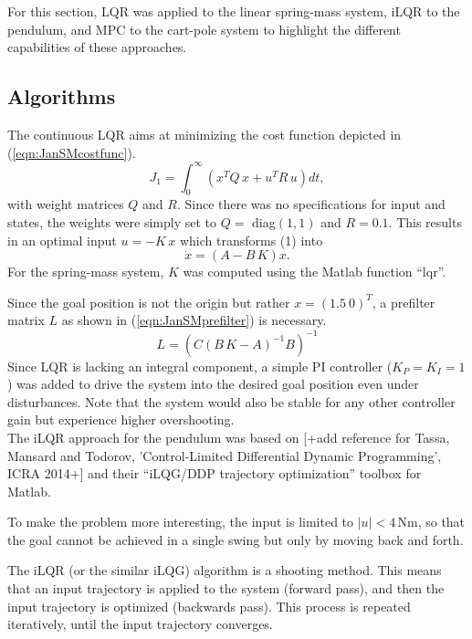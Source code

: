 \documentclass[letterpaper, 10 pt, conference]{ieeeconf}  %
\begin{document}
For this section, LQR was applied to the linear spring-mass system, iLQR to the pendulum, and MPC to the cart-pole system to highlight the different capabilities of these approaches.
\subsection{Algorithms}


The continuous LQR aims at minimizing the cost function depicted in (\ref{eqn:JanSMcostfunc}).
\begin{equation}\label{eqn:JanSMcostfunc}
	J_1 = \int^{\infty}_{0} \left(x^{T}Q\,x + u^{T}R\,u\right)dt,
\end{equation}
with weight matrices $Q$ and $R$.
Since there was no specifications for input and states, the weights were simply set to $Q=$ diag$(1,1)$ and $R=0.1$. 
This results in an optimal input $u=-K\,x$ which transforms (1) into
\begin{equation}\label{eqn:JanSMcontrolledSys}
	\dot{x} = (A-B\,K)x.
\end{equation}
For the spring-mass system, $K$ was computed using the Matlab function ``lqr''.

Since the goal position is not the origin but rather $x=(1.5 ~ 0)^T$, a prefilter matrix $L$ as shown in (\ref{eqn:JanSMprefilter}) is necessary.
\begin{equation}\label{eqn:JanSMprefilter}
L = \left(C(B\,K-A)^{-1}B\right)^{-1}
\end{equation}
Since LQR is lacking an integral component, a simple PI controller ($K_P=K_I=1$) was added to drive the system into the desired goal position even under disturbances. Note that the system would also be stable for any other controller gain but experience higher overshooting.\\

The iLQR approach for the pendulum was based on [+add reference for Tassa, Mansard and Todorov, 'Control-Limited Differential Dynamic Programming', ICRA 2014+] and their ``iLQG/DDP trajectory optimization'' toolbox for Matlab. 

 To make the problem more interesting, the input is limited to $|u|<4$\,Nm, so that the goal cannot be achieved in a single swing but only by moving back and forth. 

The iLQR (or the similar iLQG) algorithm is a shooting method. This means that an input trajectory is applied to the system (forward pass), and then the input trajectory is optimized (backwards pass). This process is repeated iteratively, until the input trajectory converges.
\end{document}
